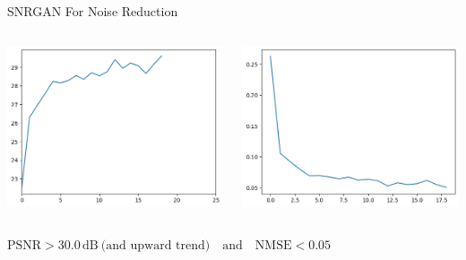 \begin{frame}{SNRGAN For Noise Reduction}
    \vspace{1em} 
    \begin{columns}
        \begin{column}{0.5\textwidth}
            \includegraphics[width=\linewidth,keepaspectratio]{images/psnr-test.png }
        \end{column}
        \begin{column}{0.5\textwidth}
            \includegraphics[width=\linewidth,keepaspectratio]{images/nmse-score.png}
        \end{column}
    \end{columns}

    \vspace{0.1em} 
    \begin{center}
        $\mathrm{PSNR} > 30.0\,\mathrm{dB} \ \text{(and upward trend)} \quad \text{and} \quad \mathrm{NMSE} < 0.05$
    \end{center}
\end{frame}

